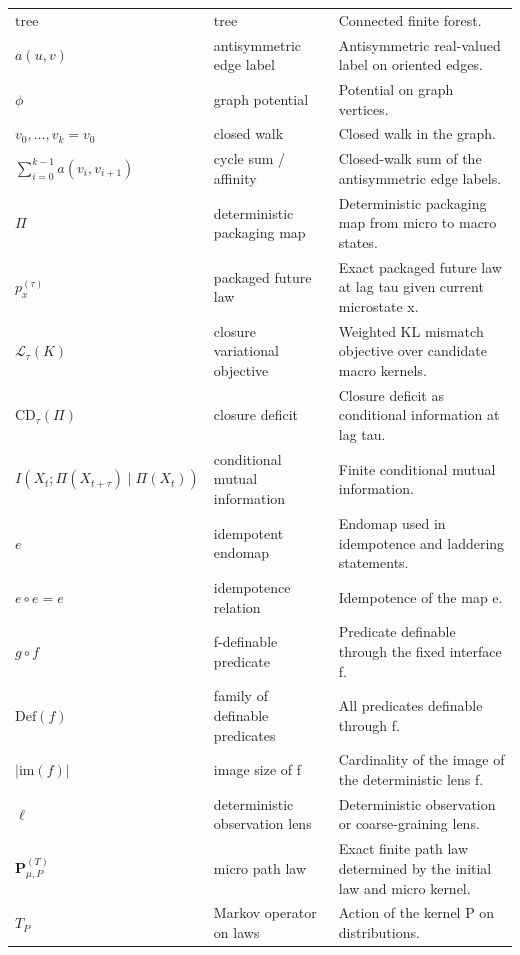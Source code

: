 \begin{longtable}{p{}p{}p{}}
$\text{tree}$ & tree & Connected finite forest. \\
$a(u,v)$ & antisymmetric edge label & Antisymmetric real-valued label on oriented edges. \\
$\phi$ & graph potential & Potential on graph vertices. \\
$v_0,\dots,v_k=v_0$ & closed walk & Closed walk in the graph. \\
$\sum_{i=0}^{k-1} a(v_i,v_{i+1})$ & cycle sum / affinity & Closed-walk sum of the antisymmetric edge labels. \\
$\Pi$ & deterministic packaging map & Deterministic packaging map from micro to macro states. \\
$p_x^{(\tau)}$ & packaged future law & Exact packaged future law at lag tau given current microstate x. \\
$\mathcal{L}_\tau(K)$ & closure variational objective & Weighted KL mismatch objective over candidate macro kernels. \\
$\mathrm{CD}_\tau(\Pi)$ & closure deficit & Closure deficit as conditional information at lag tau. \\
$I(X_t;\Pi(X_{t+\tau})\mid \Pi(X_t))$ & conditional mutual information & Finite conditional mutual information. \\
$e$ & idempotent endomap & Endomap used in idempotence and laddering statements. \\
$e\circ e=e$ & idempotence relation & Idempotence of the map e. \\
$g\circ f$ & f-definable predicate & Predicate definable through the fixed interface f. \\
$\mathrm{Def}(f)$ & family of definable predicates & All predicates definable through f. \\
$|\mathrm{im}(f)|$ & image size of f & Cardinality of the image of the deterministic lens f. \\
$\ell$ & deterministic observation lens & Deterministic observation or coarse-graining lens. \\
$\mathbf{P}^{(T)}_{\mu,P}$ & micro path law & Exact finite path law determined by the initial law and micro kernel. \\
$T_P$ & Markov operator on laws & Action of the kernel P on distributions. \\
\bottomrule
\end{longtable}
